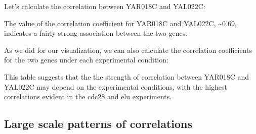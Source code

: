\documentclass[]{book}
\newenvironment{Shaded}{\begin{snugshade}}{\end{snugshade}}
\newcommand{\CommentTok}[1]{\textcolor[rgb]{0.56,0.35,0.01}{\textit{#1}}}
\newcommand{\DataTypeTok}[1]{\textcolor[rgb]{0.13,0.29,0.53}{#1}}
\newcommand{\KeywordTok}[1]{\textcolor[rgb]{0.13,0.29,0.53}{\textbf{#1}}}
\newcommand{\NormalTok}[1]{#1}
\newcommand{\OperatorTok}[1]{\textcolor[rgb]{0.81,0.36,0.00}{\textbf{#1}}}
\newcommand{\StringTok}[1]{\textcolor[rgb]{0.31,0.60,0.02}{#1}}
\theoremstyle{definition}
\theoremstyle{definition}
\theoremstyle{definition}
\theoremstyle{remark}
\begin{document}
Let's calculate the correlation between YAR018C and YAL022C:

\begin{Shaded}
\end{Shaded}

The value of the correlation coefficient for YAR018C and YAL022C,
\textasciitilde{}0.69, indicates a fairly strong association between the
two genes.

As we did for our visualization, we can also calculate the correlation
coefficients for the two genes under each experimental condition:

\begin{Shaded}
\end{Shaded}

This table suggests that the the strength of correlation between YAR018C
and YAL022C may depend on the experimental conditions, with the highest
correlations evident in the cdc28 and elu experiments.

\hypertarget{large-scale-patterns-of-correlations}{%
\subsection{Large scale patterns of
correlations}\label{large-scale-patterns-of-correlations}}
\end{document}
